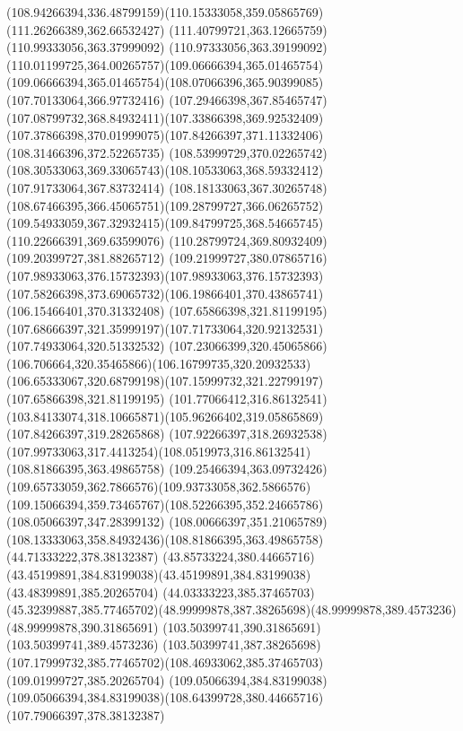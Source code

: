 {{		\curveto(108.94266394,336.48799159)(110.15333058,359.05865769)(111.26266389,362.66532427)
		\lineto(111.40799721,363.12665759)
		\lineto(110.99333056,363.37999092)
		\curveto(110.97333056,363.39199092)(110.01199725,364.00265757)(109.06666394,365.01465754)
		\curveto(109.06666394,365.01465754)(108.07066396,365.90399085)(107.70133064,366.97732416)
		\curveto(107.29466398,367.85465747)(107.08799732,368.84932411)(107.33866398,369.92532409)
		\curveto(107.37866398,370.01999075)(107.84266397,371.11332406)(108.31466396,372.52265735)
		\lineto(108.53999729,370.02265742)
		\curveto(108.30533063,369.33065743)(108.10533063,368.59332412)(107.91733064,367.83732414)
		\curveto(108.18133063,367.30265748)(108.67466395,366.45065751)(109.28799727,366.06265752)
		\curveto(109.54933059,367.32932415)(109.84799725,368.54665745)(110.22666391,369.63599076)
		\lineto(110.28799724,369.80932409)
		\lineto(109.20399727,381.88265712)
		\curveto(109.21999727,380.07865716)(107.98933063,376.15732393)(107.98933063,376.15732393)
		\curveto(107.58266398,373.69065732)(106.19866401,370.43865741)(106.15466401,370.31332408)
		\moveto(107.65866398,321.81199195)
		\curveto(107.68666397,321.35999197)(107.71733064,320.92132531)(107.74933064,320.51332532)
		\curveto(107.23066399,320.45065866)(106.706664,320.35465866)(106.16799735,320.20932533)
		\curveto(106.65333067,320.68799198)(107.15999732,321.22799197)(107.65866398,321.81199195)
		\moveto(101.77066412,316.86132541)
		\curveto(103.84133074,318.10665871)(105.96266402,319.05865869)(107.84266397,319.28265868)
		\curveto(107.92266397,318.26932538)(107.99733063,317.4413254)(108.0519973,316.86132541)
		\closepath
		\moveto(108.81866395,363.49865758)
		\curveto(109.25466394,363.09732426)(109.65733059,362.7866576)(109.93733058,362.5866576)
		\curveto(109.15066394,359.73465767)(108.52266395,352.24665786)(108.05066397,347.28399132)
		\curveto(108.00666397,351.21065789)(108.13333063,358.84932436)(108.81866395,363.49865758)
		\moveto(44.71333222,378.38132387)
		\curveto(43.85733224,380.44665716)(43.45199891,384.83199038)(43.45199891,384.83199038)
		\lineto(43.48399891,385.20265704)
		\lineto(44.03333223,385.37465703)
		\curveto(45.32399887,385.77465702)(48.99999878,387.38265698)(48.99999878,389.4573236)
		\lineto(48.99999878,390.31865691)
		\lineto(103.50399741,390.31865691)
		\lineto(103.50399741,389.4573236)
		\curveto(103.50399741,387.38265698)(107.17999732,385.77465702)(108.46933062,385.37465703)
		\lineto(109.01999727,385.20265704)
		\lineto(109.05066394,384.83199038)
		\curveto(109.05066394,384.83199038)(108.64399728,380.44665716)(107.79066397,378.38132387)
}}
